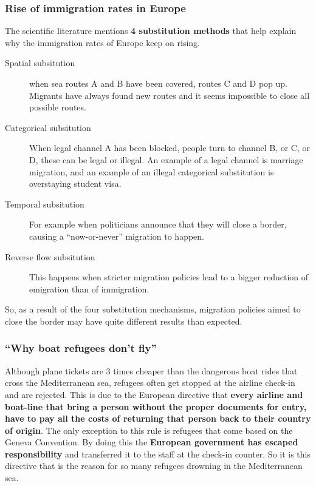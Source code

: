 \documentclass[../summary.tex]{subfiles}
\begin{document}
 	\subsubsection{Rise of immigration rates in Europe}
 	The scientific literature mentions \textbf{4 substitution methods} that help explain why the immigration rates of Europe keep on rising.
 	\begin{description}
 		\item[Spatial subsitution] when sea routes A and B have been covered, routes C and D pop up. Migrants have always found new routes and it seems impossible to close all possible routes.
 		\item[Categorical subsitution] When legal channel A has been blocked, people turn to channel B, or C, or D, these can be legal or illegal. An example of a legal channel is marriage migration, and an example of an illegal categorical substitution is overstaying student visa.
 		\item[Temporal subsitution] For example when politicians announce that they will close a border, causing a ``now-or-never'' migration to happen.
 		\item[Reverse flow subsitution] This happens when stricter migration policies lead to a bigger reduction of emigration than of immigration.
 	\end{description}
 	So, as a result of the four substitution mechanisms, migration policies aimed to close the border may have quite different results than expected.
 	
 	\subsubsection{``Why boat refugees don't fly''}
 	Although plane tickets are 3 times cheaper than the dangerous boat rides that cross the Mediterranean sea, refugees often get stopped at the airline check-in and are rejected. This is due to the European directive that \textbf{every airline and boat-line that bring a person without the proper documents for entry, have to pay all the costs of returning that person back to their country of origin}. The only exception to this rule is refugees that come based on the Geneva Convention. By doing this the \textbf{European government has escaped responsibility }and transferred it to the staff at the check-in counter. So it is this directive that is the reason for so many refugees drowning in the Mediterranean sea.
 	
\end{document}
